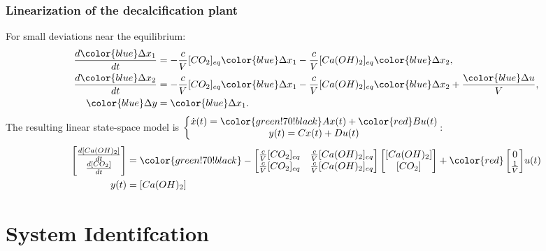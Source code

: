 \begin{frame}
	\frametitle{Linearization of the decalcification plant}
	For small deviations near the equilibrium:
	\begin{align*}
	\frac{d{\color{blue}\Delta x_1}}{dt} &= -\frac{c}{V} [CO_2]_{eq} {\color{blue}\Delta x_1} - \frac{c}{V} [Ca(OH)_2]_{eq} {\color{blue}\Delta x_2}, \\
	\frac{d{\color{blue}\Delta x_2}}{dt} &= -\frac{c}{V} [CO_2]_{eq} {\color{blue}\Delta x_1} - \frac{c}{V} [Ca(OH)_2]_{eq} {\color{blue}\Delta x_2} + \frac{{\color{blue}\Delta u}}{V}, \\
	{\color{blue}\Delta y} &= {\color{blue}\Delta x_1}.
	\end{align*}
	\pause
	The resulting linear state-space model is $\begin{aligned}\left\{ \begin{matrix} \dot{x}(t) = {\color{green!70!black}A}x(t) + {\color{red}B}u(t) \\ y(t) = Cx(t) + Du(t) \end{matrix}\right.\end{aligned}$:
	\begin{align*}
	\begin{bmatrix}
	\frac{d[Ca(OH)_2]}{dt} \\
	\frac{d[CO_2]}{dt}
	\end{bmatrix} &= 
	{\color{green!70!black}
		-\begin{bmatrix}
		\frac{c}{V}[CO_2]_{eq} & \frac{c}{V}[Ca(OH)_2]_{eq} \\
		\frac{c}{V}[CO_2]_{eq} & \frac{c}{V}[Ca(OH)_2]_{eq} \\
		\end{bmatrix}}
	\begin{bmatrix}
	[Ca(OH)_2] \\
	[CO_2]
	\end{bmatrix} +
	{\color{red}
		\begin{bmatrix}
		0 \\
		\frac{1}{V} \\
		\end{bmatrix}} u(t) \\
	y(t) &= [Ca(OH)_2]
	\end{align*}
\end{frame}

\section{System Identifcation}


